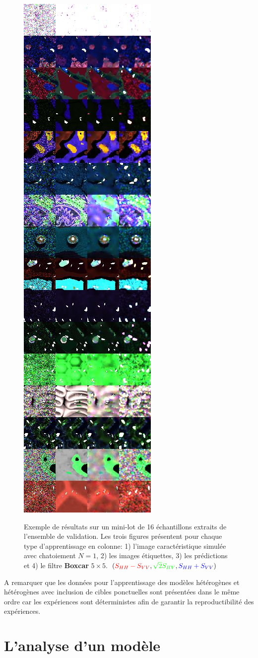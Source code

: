 \begin{figure}[!htbp]
{\includegraphics[width=0.3  \textwidth]{figures/Chap4/training_examples_batch/training_random_texture_with_pts_batch.jpg}}
 \caption{
  \small{Exemple de résultats sur un mini-lot de 16 échantillons extraits de l'ensemble de validation. Les trois figures présentent pour chaque type d'apprentissage en colonne: 1) l'image caractéristique simulée avec chatoiement $N=1$, 2) les images étiquettes, 3) les prédictions et 4) le filtre \textbf{Boxcar} $5 \times 5$. $(\textcolor{red}{S_{HH}-S_{VV}}, \textcolor{green}{\sqrt{2}S_{HV}}, \textcolor{blue}{S_{HH}+S_{VV}})$}
  }
    \label{fig:training_batches}
\end{figure}

A remarquer que les données pour l'apprentissage des modèles hétérogènes et hétérogènes avec inclusion de cibles ponctuelles sont présentées dans le même ordre car les expériences sont déterministes afin de garantir la reproductibilité des expériences.

\section{L'analyse d'un modèle}

